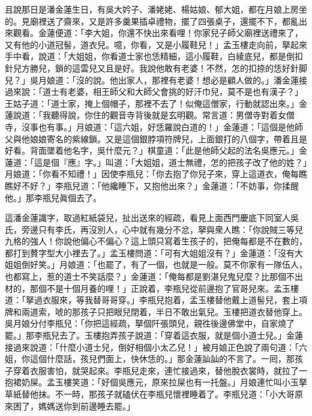 且說那日是潘金蓮生日，有吳大妗子、潘姥姥、楊姑娘、郁大姐，都在月娘上房坐的。見廟裡送了齋來，又是許多羹果插卓禮物，擺了四張桌子，還擺不下，都亂出來觀看。金蓮便道：「李大姐，你還不快出來看哩！你家兒子師父廟裡送禮來了，又有他的小道冠髻，道衣兒。噫，{}你看，又是小履鞋兒！」孟玉樓走向前，拏起來手中看，說道：「大姐姐，你看道士家也恁精細，這小履鞋，白綾底兒，都是倒扣針兒方勝兒，鎖的這雲兒又且是好。我說他敢有老婆！不然，怎的扣捺的恁好針脚兒？」吳月娘道：「沒的說。他出家人，那裡有老婆！{}想必是顧人做的。」潘金蓮接過來說：「道士有老婆，相王師父和大師父會挑的好汗巾兒，莫不是也有漢子？」{}王姑子道：「道士家，掩上個帽子，那裡不去了！似俺這僧家，行動就認出來。」{}金蓮說道：「我聽得說，你住的觀音寺背後就是玄明觀。常言道：男僧寺對着女僧寺，沒事也有事。」月娘道：「這六姐，好恁羅說白道的！」金蓮道：「這個是他師父與他娘娘寄名的紫線鎖。又是這個銀脖項符牌兒，上面銀打的八個字，帶着且是好看。背面墜着他名字，吳什麼元？」棋童道：「此是他師父起的法名吳應元。」金蓮道：「這是個『應』字。」{}叫道：「大姐姐，道士無禮，怎的把孩子改了他的姓？」{}月娘道：「你看不知禮！」因使李瓶兒：「你去抱了你兒子來，穿上這道衣，俺每瞧瞧好不好？」李瓶兒道：「他纔睡下，又抱他出來？」金蓮道：「不妨事，你揉醒他。」那李瓶兒眞個去了。

這潘金蓮識字，取過紅紙袋兒，扯出送來的經疏，看見上面西門慶底下同室人吳氏，旁邊只有李氏，再沒別人，心中就有幾分不忿，拏與衆人瞧：「你說賊三等兒九格的強人！你說他偏心不偏心？這上頭只寫着生孩子的，把俺每都是不在數的，都打到贅字型大小裡去了。」孟玉樓問道：「可有大姐姐沒有？」金蓮道：「沒有大姐姐倒好笑。」{}{}月娘道：「也罷了，有了一個，也就是一般。莫不你家有一隊伍人，也都寫上，惹的道士不笑話麼？」金蓮道：「俺每都是劉湛兒鬼兒麼？比那個不出材的，那個不是十個月養的哩！」正說着，李瓶兒從前邊抱了官哥兒來。孟玉樓道：「拏過衣服來，等我替哥哥穿。」李瓶兒抱着，孟玉樓替他戴上道髻兒，套上項牌和兩道索，唬的那孩子只把眼兒閉着，半日不敢出氣兒。玉樓把道衣替他穿上。吳月娘分付李瓶兒：「你把這經疏，拏個阡張頭兒，親徃後邊佛堂中，自家燒了罷。」那李瓶兒去了。玉樓抱弄孩子說道：「穿着這衣服，就是個小道士兒。」金蓮接過來說道：「什麼小道士兒，倒好相個小太乙兒！」被月娘正色說了兩句道：「六姐，你這個什麼話，孩兒們面上，快休恁的。」那金蓮訕訕的不言了。{}一囘，那孩子穿着衣服害怕，就哭起來。李瓶兒走來，連忙接過來，替他脫衣裳時，就拉了一抱裙奶屎。孟玉樓笑道：「好個吳應元，原來拉屎也有一托盤。」月娘連忙叫小玉拏草紙替他抹。不一時，那孩子就磕伏在李瓶兒懷裡睡着了。李瓶兒道：「小大哥原來困了，媽媽送你到前邊睡去罷。」

